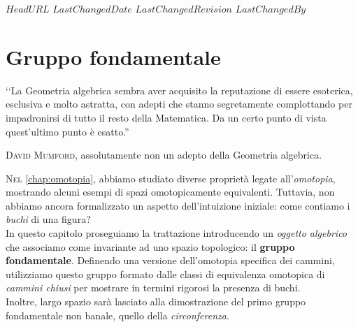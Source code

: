 \svnidlong
{$HeadURL$}
{$LastChangedDate$}
{$LastChangedRevision$}
{$LastChangedBy$}

\chapter{Gruppo fondamentale}

\begin{introduction}
	‘‘La Geometria algebrica sembra aver acquisito la reputazione di essere esoterica, esclusiva e molto astratta, con adepti che stanno segretamente complottando per impadronirsi di tutto il resto della Matematica. Da un certo punto di vista quest'ultimo punto è esatto.''
	\begin{flushright}
		\textsc{David Mumford,} assolutamente non un adepto della Geometria algebrica.
	\end{flushright}
\end{introduction}
\lettrine[findent=1pt, nindent=0pt]{N}{el} \autoref{chap:omotopia}, abbiamo studiato diverse proprietà legate all'\textit{omotopia}, mostrando alcuni esempi di spazi omotopicamente equivalenti. Tuttavia, non abbiamo ancora formalizzato un aspetto dell'intuizione iniziale: come contiamo i \textit{buchi} di una figura?\\
In questo capitolo proseguiamo la trattazione introducendo un \textit{oggetto algebrico} che associamo come invariante ad uno spazio topologico: il \textbf{gruppo fondamentale}. Definendo una versione dell'omotopia specifica dei cammini, utilizziamo questo gruppo formato dalle classi di equivalenza omotopica di \textit{cammini chiusi} per mostrare in termini rigorosi la presenza di buchi.\\
Inoltre, largo spazio sarà lasciato alla dimostrazione del primo gruppo fondamentale non banale, quello della \textit{circonferenza}.
